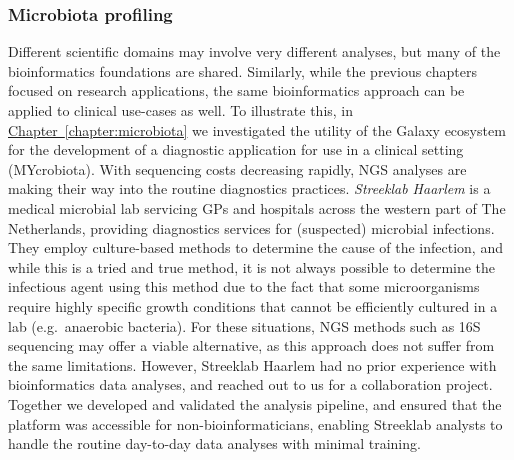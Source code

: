 \begin{justify}

\subsubsection*{Microbiota profiling}
Different scientific domains may involve very different analyses, but many of the bioinformatics foundations are shared.
Similarly, while the previous chapters focused on research applications, the same bioinformatics approach can be applied to clinical use-cases as well.
To illustrate this, in \hyperref[chapter:microbiota]{Chapter~\ref{chapter:microbiota}} we investigated the utility of the Galaxy ecosystem for the development of a diagnostic application for use in a clinical setting (MYcrobiota).
With sequencing costs decreasing rapidly, NGS analyses are making their way into the routine diagnostics practices.
\emph{Streeklab Haarlem} is a medical microbial lab servicing GPs and hospitals across the western part of The Netherlands, providing diagnostics services for (suspected) microbial infections.
They employ culture-based methods to determine the cause of the infection, and while this is a tried and true method, it is not always possible to determine the infectious agent using this method due to the fact that some microorganisms require highly specific growth conditions that cannot be efficiently cultured in a lab (e.g.\ anaerobic bacteria).
For these situations, NGS methods such as 16S sequencing may offer a viable alternative, as this approach does not suffer from the same limitations.
However, Streeklab Haarlem had no prior experience with bioinformatics data analyses, and reached out to us for a collaboration project.
Together we developed and validated the analysis pipeline, and ensured that the platform was accessible for non-bioinformaticians, enabling Streeklab analysts to handle the routine day-to-day data analyses with minimal training.


\end{justify}
